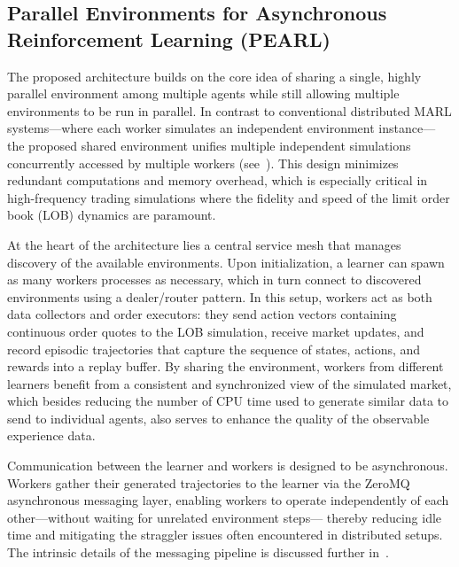 

    \subsection{Parallel Environments for Asynchronous Reinforcement Learning (PEARL)}
    \label{subsec:pearl}
    The proposed architecture builds on the core idea of sharing a single, highly parallel environment among multiple agents while
    still allowing multiple environments to be run in parallel.
    In contrast to conventional distributed MARL systems—where each worker simulates an independent environment instance—
    the proposed shared environment unifies multiple independent simulations concurrently accessed by multiple workers
    (see~).
    This design minimizes redundant computations and memory overhead,
    which is especially critical in high-frequency trading simulations where the fidelity and speed of the limit order book (LOB) dynamics are paramount.

    At the heart of the architecture lies a central service mesh that manages discovery of the available environments.
    Upon initialization, a learner can spawn as many workers processes as necessary,
    which in turn connect to discovered environments using a dealer/router pattern.
    In this setup, workers act as both data collectors and order executors:
    they send action vectors containing continuous order quotes to the LOB simulation,
    receive market updates, and record episodic trajectories that capture the sequence of states, actions, and rewards into a replay buffer.
    By sharing the environment, workers from different learners benefit from a consistent and synchronized view of the simulated market,
    which besides reducing the number of CPU time used to generate similar data to send to individual agents,
    also serves to enhance the quality of the observable experience data.

    Communication between the learner and workers is designed to be asynchronous.
    Workers gather their generated trajectories to the learner via the ZeroMQ asynchronous messaging layer,
    enabling workers to operate independently of each other—without waiting for unrelated environment steps—
    thereby reducing idle time and mitigating the straggler issues often encountered in distributed setups.
    The intrinsic details of the messaging pipeline is discussed further in~.

